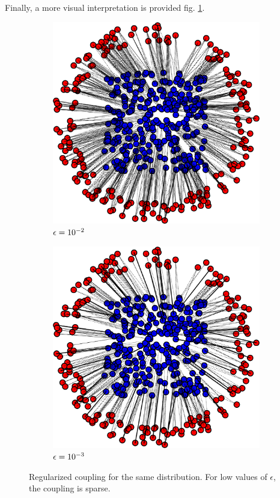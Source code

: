 Finally, a more visual interpretation is provided fig. \ref{fig:coupling_eps}.

\begin{figure}[h]
     \centering
     \begin{subfigure}[t]{0.49\textwidth}
         \centering
         \includegraphics[width=\textwidth]{samples/2/coupling_eps_1e-2.png}
         \caption{$\epsilon=10^{-2}$}
     \end{subfigure}
     \hfill
     \begin{subfigure}[t]{0.49\textwidth}
         \centering
         \includegraphics[width=\textwidth]{samples/2/coupling_eps_1e-3.png}
         \caption{$\epsilon=10^{-3}$}
     \end{subfigure}
    \caption{Regularized coupling for the same distribution. For low values of $\epsilon$, the coupling is sparse.}
    \label{fig:coupling_eps}
\end{figure}

